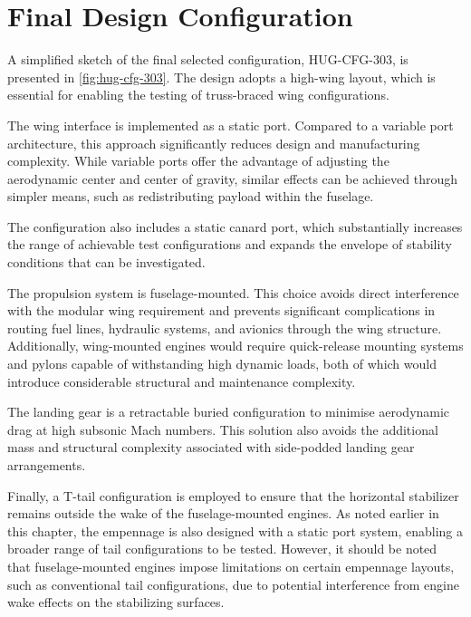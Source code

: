 \section{Final Design Configuration}
\label{sec:trade-off_final_design}

A simplified sketch of the final selected configuration, HUG-CFG-303, is presented in \autoref{fig:hug-cfg-303}. The design adopts a high-wing layout, which is essential for enabling the testing of truss-braced wing configurations.

The wing interface is implemented as a static port. Compared to a variable port architecture, this approach significantly reduces design and manufacturing complexity. While variable ports offer the advantage of adjusting the aerodynamic center and center of gravity, similar effects can be achieved through simpler means, such as redistributing payload within the fuselage.

The configuration also includes a static canard port, which substantially increases the range of achievable test configurations and expands the envelope of stability conditions that can be investigated.

The propulsion system is fuselage-mounted. This choice avoids direct interference with the modular wing requirement and prevents significant complications in routing fuel lines, hydraulic systems, and avionics through the wing structure. Additionally, wing-mounted engines would require quick-release mounting systems and pylons capable of withstanding high dynamic loads, both of which would introduce considerable structural and maintenance complexity.

The landing gear is a retractable buried configuration to minimise aerodynamic drag at high subsonic Mach numbers. This solution also avoids the additional mass and structural complexity associated with side-podded landing gear arrangements.

Finally, a T-tail configuration is employed to ensure that the horizontal stabilizer remains outside the wake of the fuselage-mounted engines. As noted earlier in this chapter, the empennage is also designed with a static port system, enabling a broader range of tail configurations to be tested. However, it should be noted that fuselage-mounted engines impose limitations on certain empennage layouts, such as conventional tail configurations, due to potential interference from engine wake effects on the stabilizing surfaces.





